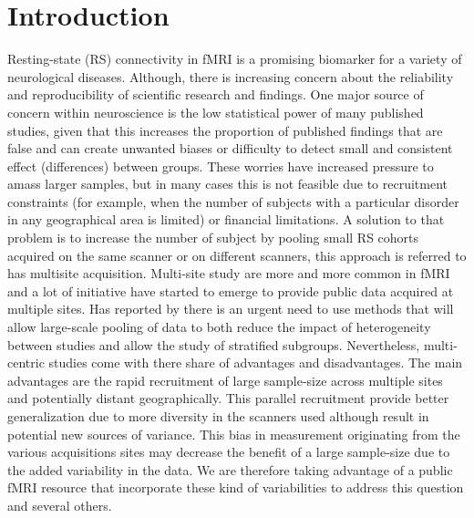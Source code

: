 \documentclass[authoryear]{elsarticle}
\begin{document}
\section{Introduction}


Resting-state (RS) connectivity in fMRI is a promising biomarker for a variety of neurological diseases. Although, there is increasing concern about the reliability and reproducibility of scientific research and findings. One major source of concern within neuroscience is the low statistical power of many published studies, given that this increases the proportion of published findings that are false and can create unwanted biases or difficulty to detect small and consistent effect (differences) between groups. These worries have increased pressure to amass larger samples, but in many cases this is not feasible due to recruitment constraints (for example, when the number of subjects with a particular disorder in any geographical area is limited) or financial limitations. A solution to that problem is to increase the number of subject by pooling small RS cohorts acquired on the same scanner or on different scanners, this approach is referred to has multisite acquisition. Multi-site study are more and more common in fMRI and a lot of initiative have started to emerge to provide public data acquired at multiple sites. Has reported by \cite{Cheng2015} there is an urgent need to use methods that will allow large-scale pooling of data to both reduce the impact of heterogeneity between studies and allow the study of stratified subgroups. Nevertheless, multi-centric studies come with there share of advantages and disadvantages. The main advantages are the rapid recruitment of large sample-size across multiple sites and potentially distant geographically. This parallel recruitment provide better generalization due to more diversity in the scanners used although result in potential new sources of variance. This bias in measurement originating from the various acquisitions sites may decrease the benefit of a large sample-size due to the added variability in the data. We are therefore taking advantage of a public fMRI resource that incorporate these kind of variabilities to address this question and several others.
\end{document}
